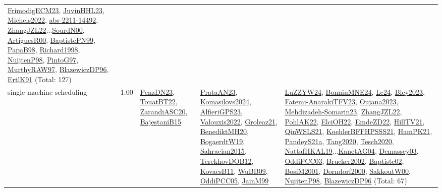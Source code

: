 {\begin{longtable}{p{3cm}r>{\raggedright\arraybackslash}p{6cm}>{\raggedright\arraybackslash}p{6cm}>{\raggedright\arraybackslash}p{8cm}}
\hyperref[detail:FrimodigECM23]{FrimodigECM23}, \hyperref[detail:JuvinHHL23]{JuvinHHL23}, \hyperref[detail:Michels2022]{Michels2022}, \hyperref[detail:abs-2211-14492]{abs-2211-14492}, \hyperref[detail:ZhangJZL22]{ZhangJZL22}...\hyperref[detail:SourdN00]{SourdN00}, \hyperref[detail:ArtiguesR00]{ArtiguesR00}, \hyperref[detail:BaptistePN99]{BaptistePN99}, \hyperref[detail:PapaB98]{PapaB98}, \hyperref[detail:Richard1998]{Richard1998}, \hyperref[detail:NuijtenP98]{NuijtenP98}, \hyperref[detail:PintoG97]{PintoG97}, \hyperref[detail:MurthyRAW97]{MurthyRAW97}, \hyperref[detail:BlazewiczDP96]{BlazewiczDP96}, \hyperref[detail:ErtlK91]{ErtlK91} (Total: 127)\\
\index{single-machine scheduling}\index{Concepts!single-machine scheduling}single-machine scheduling &  1.00 & \hyperref[detail:PenzDN23]{PenzDN23}, \hyperref[detail:TouatBT22]{TouatBT22}, \hyperref[detail:ZarandiASC20]{ZarandiASC20}, \hyperref[detail:BajestaniB15]{BajestaniB15} & \hyperref[detail:PrataAN23]{PrataAN23}, \hyperref[detail:Komasilovs2024]{Komasilovs2024}, \hyperref[detail:AlfieriGPS23]{AlfieriGPS23}, \hyperref[detail:Valouxis2022]{Valouxis2022}, \hyperref[detail:Groleaz21]{Groleaz21}, \hyperref[detail:BenediktMH20]{BenediktMH20}, \hyperref[detail:BogaerdtW19]{BogaerdtW19}, \hyperref[detail:Sahraeian2015]{Sahraeian2015}, \hyperref[detail:TerekhovDOB12]{TerekhovDOB12}, \hyperref[detail:KovacsB11]{KovacsB11}, \hyperref[detail:WuBB09]{WuBB09}, \hyperref[detail:OddiPCC05]{OddiPCC05}, \hyperref[detail:JainM99]{JainM99} & \hyperref[detail:LuZZYW24]{LuZZYW24}, \hyperref[detail:BonninMNE24]{BonninMNE24}, \hyperref[detail:Le24]{Le24}, \hyperref[detail:Bley2023]{Bley2023}, \hyperref[detail:Fatemi-AnarakiTFV23]{Fatemi-AnarakiTFV23}, \hyperref[detail:Oujana2023]{Oujana2023}, \hyperref[detail:Mehdizadeh-Somarin23]{Mehdizadeh-Somarin23}, \hyperref[detail:ZhangJZL22]{ZhangJZL22}, \hyperref[detail:PohlAK22]{PohlAK22}, \hyperref[detail:ElciOH22]{ElciOH22}, \hyperref[detail:EmdeZD22]{EmdeZD22}, \hyperref[detail:HillTV21]{HillTV21}, \hyperref[detail:QinWSLS21]{QinWSLS21}, \hyperref[detail:KoehlerBFFHPSSS21]{KoehlerBFFHPSSS21}, \hyperref[detail:HamPK21]{HamPK21}, \hyperref[detail:PandeyS21a]{PandeyS21a}, \hyperref[detail:Tang2020]{Tang2020}, \hyperref[detail:Tesch2020]{Tesch2020}, \hyperref[detail:NattafHKAL19]{NattafHKAL19}...\hyperref[detail:KanetAG04]{KanetAG04}, \hyperref[detail:Demassey03]{Demassey03}, \hyperref[detail:OddiPCC03]{OddiPCC03}, \hyperref[detail:Brucker2002]{Brucker2002}, \hyperref[detail:Baptiste02]{Baptiste02}, \hyperref[detail:BosiM2001]{BosiM2001}, \hyperref[detail:Dorndorf2000]{Dorndorf2000}, \hyperref[detail:SakkoutW00]{SakkoutW00}, \hyperref[detail:NuijtenP98]{NuijtenP98}, \hyperref[detail:BlazewiczDP96]{BlazewiczDP96} (Total: 67)\\

\end{longtable}}
